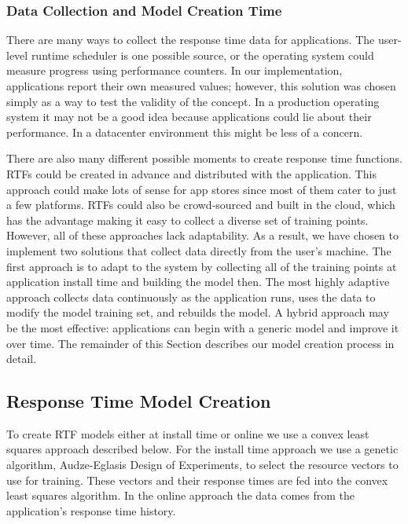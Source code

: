 %
%
%


\subsubsection*{Data Collection and Model Creation Time}
There are many ways to collect the response time data for applications. The user-level runtime scheduler is one possible source, or the operating system could measure progress using performance counters.  In our implementation, applications report their own measured values; however, this solution was chosen simply as a way to test the validity of the concept.  In a production operating system it may not be a good idea because applications could lie about their performance.  In a datacenter environment this might be less of a concern.

There are also many different possible moments to create response time functions.  RTFs could be created in advance and distributed with the application. This approach could make lots of sense for app stores since most of them cater to just a few platforms. RTFs could also be crowd-sourced and built in the cloud, which has the advantage making it easy to collect a diverse set of training points.  However, all of these approaches lack adaptability.  As a result, we have chosen to implement two solutions that collect data directly from the user's machine.  The first approach is to adapt to the system by collecting all of the training points at application install time and building the model then.  The most highly adaptive approach collects data continuously as the application runs, uses the data to modify the model training set, and rebuilds the model.  A hybrid approach may be the most effective: applications can begin with a generic model and improve it over time. The remainder of this Section describes our model creation process in detail.
\subsection{Response Time Model Creation}
To create RTF models either at install time or online we use a convex least squares approach described below.  For the install time approach we use a genetic algorithm, Audze-Eglasis Design of Experiments\cite{bates-aes03}, to select the resource vectors to use for training.  These vectors and their response times are fed into the convex least squares algorithm. In the online approach the data comes from the application's response time history.

